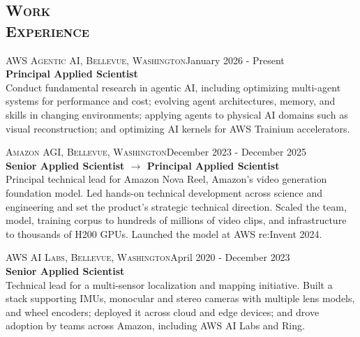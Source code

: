\documentclass[margin, line]{res} %
\begin{document}
\begin{resume}
\section{\textsc{Work\\Experience}}

\textsc{AWS Agentic AI, Bellevue, Washington}\hfill January 2026 - Present \\
\textbf{Principal Applied Scientist}\\ 
Conduct fundamental research in agentic AI, including optimizing multi-agent systems for performance and cost; evolving agent architectures, memory, and skills in changing environments; applying agents to physical AI domains such as visual reconstruction; and optimizing AI kernels for AWS Trainium accelerators.

\textsc{Amazon AGI, Bellevue, Washington}\hfill December 2023 - December 2025 \\
\textbf{Senior Applied Scientist $\rightarrow$ Principal Applied Scientist}\\ 
Principal technical lead for Amazon Nova Reel, Amazon's video generation foundation model. Led hands-on technical development across science and engineering and set the product's strategic technical direction. Scaled the team, model, training corpus to hundreds of millions of video clips, and infrastructure to thousands of H200 GPUs. Launched the model at AWS re:Invent 2024.

\textsc{AWS AI Labs, Bellevue, Washington}\hfill April 2020 - December 2023 \\
\textbf{Senior Applied Scientist}\\ 
Technical lead for a multi-sensor localization and mapping initiative. Built a stack supporting IMUs, monocular and stereo cameras with multiple lens models, and wheel encoders; deployed it across cloud and edge devices; and drove adoption by teams across Amazon, including AWS AI Labs and Ring.





\end{resume}
\end{document}
